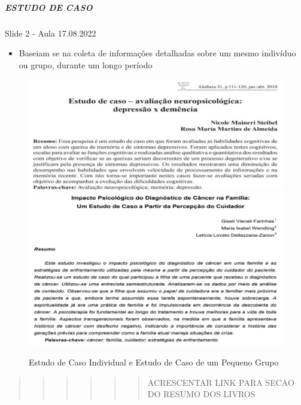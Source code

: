 \documentclass[
]{book}
\providecommand{\tightlist}{%
  \setlength{\itemsep}{0pt}\setlength{\parskip}{0pt}}
\begin{document}
\hypertarget{estudo-de-caso}{%
\subparagraph{ESTUDO DE CASO}\label{estudo-de-caso}}

Slide 2 - Aula 17.08.2022

\begin{itemize}
\tightlist
\item
  Baseiam se na coleta de informações detalhadas sobre um mesmo indivíduo ou grupo, durante um longo período
\end{itemize}

\begin{figure}

{\centering \includegraphics[width=0.8\linewidth]{imagens/estudo-de-caso-individual} \includegraphics[width=0.8\linewidth]{imagens/estudo-de-caso-pequeno-grupo} 

}

\caption{Estudo de Caso Individual e Estudo de Caso de um Pequeno Grupo}\label{fig:unnamed-chunk-14}
\end{figure}

\begin{quote}
\begin{quote}
\begin{quote}
\begin{quote}
\begin{quote}
\begin{quote}
ACRESCENTAR LINK PARA SECAO DO RESUMO DOS LIVROS
\end{quote}
\end{quote}
\end{quote}
\end{quote}
\end{quote}
\end{quote}
\end{document}
